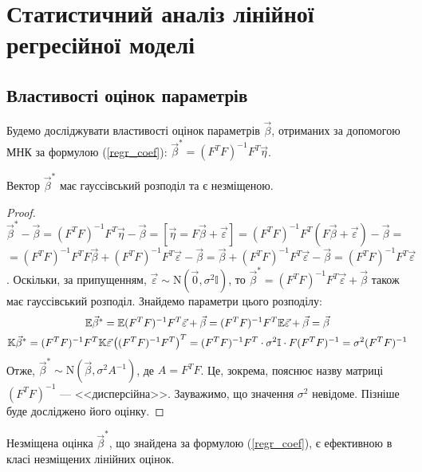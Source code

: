 \section{Статистичний аналіз лінійної регресійної моделі}
\subsection{Властивості оцінок параметрів}
Будемо досліджувати властивості оцінок параметрів $\vec{\beta}$, отриманих за допомогою МНК
за формулою (\ref{regr_coef}): $\vec{\beta}^* = (F^T F)^{-1} F^T \vec{\eta}$.
\begin{proposition}\label{regr_unbiased}
    Вектор $\vec{\beta}^*$ має гауссівський розподіл та є незміщеною.
\end{proposition}
\begin{proof}
    $\vec{\beta}^* - \vec{\beta} = (F^T F)^{-1} F^T \vec{\eta} - \vec{\beta} = 
    \left[\vec{\eta} = F\vec{\beta} + \vec{\varepsilon}\right] =
    (F^T F)^{-1} F^T (F\vec{\beta} + \vec{\varepsilon}) - \vec{\beta} = $\\
    $= (F^T F)^{-1} F^T F \vec{\beta} + (F^T F)^{-1} F^T \vec{\varepsilon} - \vec{\beta} = 
    \vec{\beta} + (F^T F)^{-1} F^T \vec{\varepsilon} - \vec{\beta} = (F^T F)^{-1} F^T \vec{\varepsilon}$.
    Оскільки, за припущенням, $\vec{\varepsilon} \sim \mathrm{N}(\vec{0}, \sigma^2 \mathbb{I})$,
    то $\vec{\beta}^* = (F^T F)^{-1} F^T \vec{\varepsilon} + \vec{\beta}$ також має гауссівський розподіл.
    Знайдемо параметри цього розподілу:
    \begin{gather*}
        \mathbb{E}\vec{\beta}^* = \mathbb{E} (F^T F)^{-1} F^T \vec{\varepsilon} + \vec{\beta} = 
        (F^T F)^{-1} F^T \mathbb{E}\vec{\varepsilon} + \vec{\beta} = \vec{\beta} \\
        \mathbb{K}\vec{\beta}^* = (F^T F)^{-1} F^T \mathbb{K}\vec{\varepsilon} \left((F^T F)^{-1} F^T\right)^T = 
        (F^T F)^{-1} F^T \cdot \sigma^2 \mathbb{I} \cdot F (F^T F)^{-1} = \sigma^2 (F^T F)^{-1}
    \end{gather*}
    Отже, $\vec{\beta}^* \sim \mathrm{N}(\vec{\beta}, \sigma^2 A^{-1})$, де $A = F^T F$.
    Це, зокрема, пояснює назву матриці $(F^T F)^{-1}$ --- <<дисперсійна>>.
    Зауважимо, що значення $\sigma^2$ невідоме. Пізніше буде досліджено його оцінку.
\end{proof}
\begin{proposition} Незміщена оцінка $\vec{\beta}^*$, що знайдена за формулою
    (\ref{regr_coef}), є ефективною в класі незміщених лінійних оцінок.
\end{proposition}
